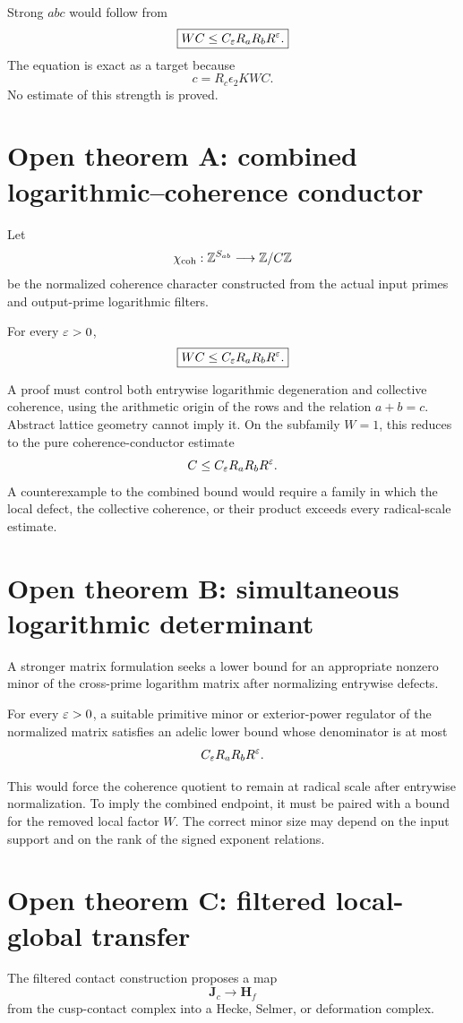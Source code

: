 Strong $abc$ would follow from
\[
\boxed{
WC
\le
C_\varepsilon R_aR_bR^\varepsilon.
}
\]
The equation is exact as a target because
\[
c=R_c\epsilon_2KWC.
\]
No estimate of this strength is proved.

\section{Open theorem A: combined logarithmic--coherence conductor}
Let
\[
\chi_{\mathrm{coh}}:\mathbb Z^{S_{ab}}\longrightarrow\mathbb Z/C\mathbb Z
\]
be the normalized coherence character constructed from the actual input primes and output-prime logarithmic filters.

\begin{conjecture}
For every $\varepsilon>0$,
\[
\boxed{
WC
\le
C_\varepsilon R_aR_bR^\varepsilon.
}
\]
\end{conjecture}

A proof must control both entrywise logarithmic degeneration and collective coherence, using the arithmetic origin of the rows and the relation $a+b=c$. Abstract lattice geometry cannot imply it. On the subfamily $W=1$, this reduces to the pure coherence-conductor estimate
\[
 C\le C_\varepsilon R_aR_bR^\varepsilon.
\]
A counterexample to the combined bound would require a family in which the local defect, the collective coherence, or their product exceeds every radical-scale estimate.

\section{Open theorem B: simultaneous logarithmic determinant}
A stronger matrix formulation seeks a lower bound for an appropriate nonzero minor of the cross-prime logarithm matrix after normalizing entrywise defects.

\begin{conjecture}
For every $\varepsilon>0$, a suitable primitive minor or exterior-power regulator of the normalized matrix satisfies an adelic lower bound whose denominator is at most
\[
C_\varepsilon R_aR_bR^\varepsilon.
\]
\end{conjecture}

This would force the coherence quotient to remain at radical scale after entrywise normalization. To imply the combined endpoint, it must be paired with a bound for the removed local factor $W$. The correct minor size may depend on the input support and on the rank of the signed exponent relations.

\section{Open theorem C: filtered local-global transfer}
The filtered contact construction proposes a map
\[
\mathbf J_c
\longrightarrow
\mathbf H_f
\]
from the cusp-contact complex into a Hecke, Selmer, or deformation complex.


